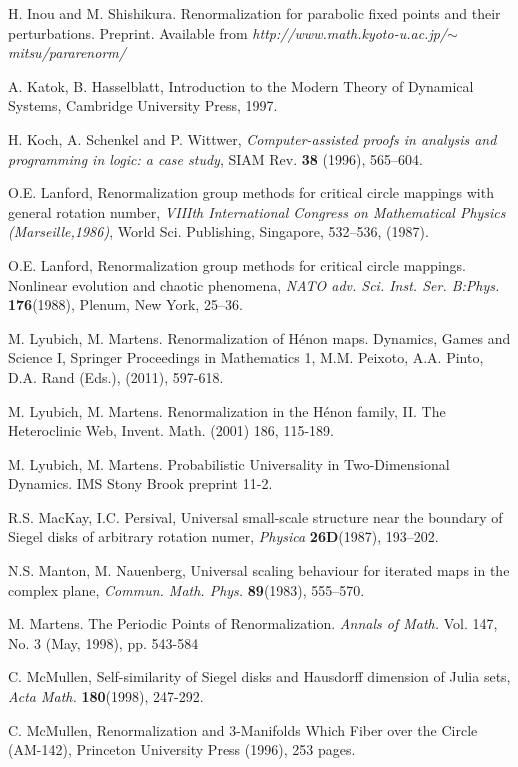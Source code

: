 \begin{thebibliography}{}
 H. Inou and M. Shishikura. Renormalization for parabolic fixed points and their perturbations.
Preprint. Available from {\sl http://www.math.kyoto-u.ac.jp/$\sim$mitsu/pararenorm/  }

 A. Katok, B. Hasselblatt,  Introduction to the Modern Theory of Dynamical Systems, Cambridge University Press, 1997.

 H. Koch, A. Schenkel and P. Wittwer, {\it Computer-assisted proofs in analysis and programming in logic: a case study}, SIAM Rev.   { \bf 38} (1996), 565--604. 

 O.E. Lanford, Renormalization group methods for critical circle mappings with general rotation number, {\it VIIIth International Congress on Mathematical Physics (Marseille,1986)}, World Sci. Publishing, Singapore, 532--536, (1987).

 O.E. Lanford, Renormalization group methods for critical circle mappings. Nonlinear evolution and chaotic phenomena, {\it NATO adv. Sci. Inst. Ser. B:Phys.} {\bf 176}(1988), Plenum, New York, 25--36.

 M. Lyubich, M. Martens. Renormalization of H\'enon maps. Dynamics, Games and Science I, Springer Proceedings in Mathematics 1, M.M. Peixoto, A.A. Pinto,  D.A. Rand (Eds.), (2011), 597-618.

M. Lyubich, M. Martens. Renormalization in the H\'enon family, II. The 
Heteroclinic Web, Invent. Math. (2001) 186, 115-189.

M. Lyubich, M. Martens. Probabilistic Universality in Two-Dimensional Dynamics. IMS Stony Brook preprint 11-2.

 R.S. MacKay, I.C. Persival, Universal small-scale structure near the boundary of Siegel disks of arbitrary rotation numer, {\it Physica} {\bf 26D}(1987), 193--202.

 N.S. Manton, M. Nauenberg, Universal scaling behaviour for iterated maps in
the complex plane, {\it Commun. Math. Phys.} {\bf 89}(1983), 555--570.

 M. Martens. 
The Periodic Points of Renormalization.
{\it Annals of Math.}
Vol. 147, No. 3 (May, 1998), pp. 543-584

 C. McMullen, Self-similarity of Siegel disks and Hausdorff dimension of  Julia sets, {\it Acta Math.} {\bf 180}(1998), 247-292.

 C. McMullen,  Renormalization and 3-Manifolds Which Fiber over the Circle (AM-142), Princeton University Press (1996), 253 pages.





\end{thebibliography}
